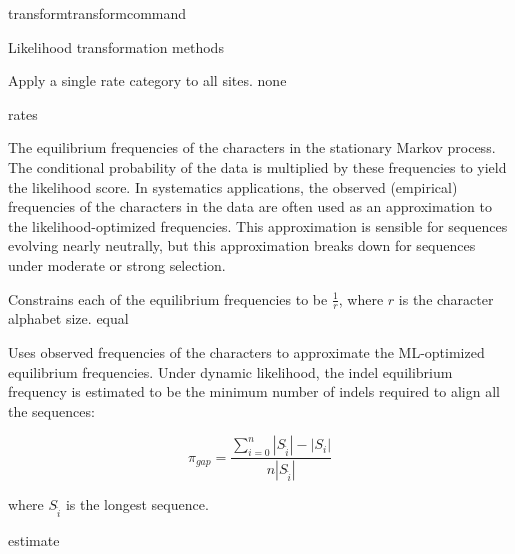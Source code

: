 \begin{command}{transform}{transformcommand}
\begin{arguments}
\begin{argumentgroup}{Likelihood transformation methods}
{\begin{description}
                        {Apply a single rate category to all sites.}
                        {none}

                \end{description}}
                {rates}

                    {The equilibrium frequencies of the characters in the stationary
                    Markov process. The conditional probability of the data is
                    multiplied by these frequencies to yield the likelihood score.
                    In systematics applications, the observed (empirical)
                    frequencies of the characters in the data are often used as an
                    approximation to the likelihood-optimized frequencies. This
                    approximation is sensible for sequences evolving nearly
                    neutrally, but this approximation breaks down for sequences
                    under moderate or strong selection.

                    \begin{description}

                            {Constrains each of the equilibrium frequencies to be
                            $\frac{1}{r}$, where $r$ is the character alphabet size.}
                            {equal}

                            {Uses observed frequencies of the characters to
                            approximate the ML-optimized equilibrium
                            frequencies.  Under dynamic likelihood, the indel
                            equilibrium frequency is estimated to be the minimum
                            number of indels required to align all the
                            sequences: 
                            
                            \begin{equation*}
                            \pi_{gap} = \frac{\sum_{i=0}^n
                            |S_{\hat{i}}| - |S_i|}{n |S_{\hat{i}}|}
                            \end{equation*}
                            
                             where
                            $S_{\hat{i}}$ is the longest sequence.}
                            {estimate}


\end{description}}
\end{argumentgroup}
\end{arguments}
\end{command}
